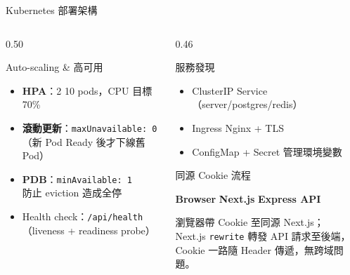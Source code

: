 \documentclass[aspectratio=169,12pt]{beamer}
\begin{document}
\begin{frame}[shrink=12]{Kubernetes 部署架構}
\begin{columns}[T,onlytextwidth]
\begin{column}{0.50\textwidth}
  \begin{block}{Auto-scaling \& 高可用}
    \begin{itemize}\small
      \item \textbf{HPA}：2 \textrightarrow{} 10 pods，CPU 目標 70\%
      \item \textbf{滾動更新}：\texttt{maxUnavailable: 0}\\（新 Pod Ready 後才下線舊 Pod）
      \item \textbf{PDB}：\texttt{minAvailable: 1}\\防止 eviction 造成全停
      \item Health check：\texttt{/api/health}\\（liveness + readiness probe）
    \end{itemize}
  \end{block}
\end{column}
\begin{column}{0.46\textwidth}
  \begin{block}{服務發現}
    \begin{itemize}\small
      \item ClusterIP Service（server/postgres/redis）
      \item Ingress Nginx + TLS
      \item ConfigMap + Secret 管理環境變數
    \end{itemize}
  \end{block}
  \begin{block}{同源 Cookie 流程}
    \begin{center}\small
      \textbf{Browser} \textrightarrow{} \textbf{Next.js}
      \textrightarrow{} \textbf{Express API}
    \end{center}
    \vspace{2pt}
    \scriptsize
    瀏覽器帶 Cookie 至同源 Next.js；\\
    Next.js \texttt{rewrite} 轉發 API 請求至後端，\\
    Cookie 一路隨 Header 傳遞，無跨域問題。
  \end{block}
\end{column}
\end{columns}
\end{frame}

\end{document}

